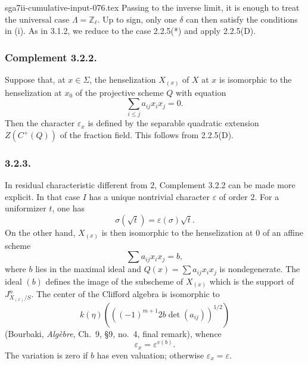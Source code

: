 \begin{filecontents*}{sga7ii-cumulative-input-076.tex}
Passing to the inverse limit, it is enough to treat the universal
case $\Lambda=\mathbb Z_\ell$.  Up to sign, only one $\delta$ can
then satisfy the conditions in (i).  As in 3.1.2, we reduce to the
case 2.2.5(*) and apply 2.2.5(D).

\subsubsection*{Complement 3.2.2.}
Suppose that, at $x\in\Sigma$, the henselization $X_{(x)}$ of $X$ at
$x$ is isomorphic to the henselization at $x_0$ of the projective
scheme $Q$ with equation
\[
\sum_{i\leq j}a_{ij}x_ix_j=0.
\]
Then the character $\varepsilon_x$ is defined by the separable
quadratic extension $Z(C^+(Q))$ of the fraction field.  This follows
from 2.2.5(D).

\subsubsection*{3.2.3.}
In residual characteristic different from $2$, Complement 3.2.2 can
be made more explicit.  In that case $I$ has a unique nontrivial
character $\varepsilon$ of order $2$.  For a uniformizer $t$, one
has
\[
\sigma(\sqrt t)=\varepsilon(\sigma)\sqrt t.
\]
On the other hand, $X_{(x)}$ is then isomorphic to the henselization
at $0$ of an affine scheme
\[
\sum a_{ij}x_ix_j=b,
\]
where $b$ lies in the maximal ideal and
$Q(x)=\sum a_{ij}x_ix_j$ is nondegenerate.  The ideal $(b)$ defines
the image of the subscheme of $X_{(x)}$ which is the support of
$J^n_{X_{(x)}/S}$.  The center of the Clifford algebra is isomorphic
to
\[
k(\eta)\left(\left((-1)^{m+1}2b\det(a_{ij})\right)^{1/2}\right)
\]
(Bourbaki, \emph{Alg\`ebre}, Ch.~9, \S9, no.~4, final remark), whence
\[
\varepsilon_x=\varepsilon^{v(b)}.
\]
The variation is zero if $b$ has even valuation; otherwise
$\varepsilon_x=\varepsilon$.
\end{filecontents*}
